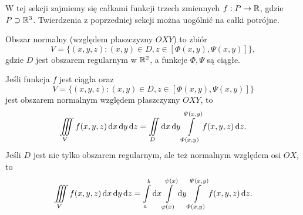 W tej sekcji zajmiemy się całkami funkcji trzech zmiennych $f : P \to \mathbb R$, gdzie $P \supset \mathbb R^3$. Twierdzenia z poprzedniej sekcji można uogólnić na całki potrójne.

\begin{definition}
    Obszar normalny (względem płaszczyzny $OXY$) to zbiór
    \[ V = \{(x, y, z) : (x, y) \in D, z \in [\varPhi(x, y), \varPsi(x, y)]\}, \]
    gdzie $D$ jest obszarem regularnym w $\mathbb R^2$, a funkcje $\varPhi, \varPsi$ są ciągłe.
\end{definition}

\begin{theorem}
    Jeśli funkcja $f$ jest ciągła oraz
    \[ V = \{(x, y, z) : (x, y) \in D, z \in [\varPhi(x, y), \varPsi(x, y)]\} \]
    jest obszarem normalnym względem płaszczyzny $OXY$, to
    \[ \iiint\limits_V f(x, y, z) \operatorname{d}\!{x} \operatorname{d}\!{y} \operatorname{d}\!{z} = \iint\limits_D \operatorname{d}\!{x} \operatorname{d}\!{y} \int\limits_{\varPhi(x, y)}^{\varPsi(x, y)} f(x, y, z) \operatorname{d}\!{z}. \]
    Jeśli $D$ jest nie tylko obszarem regularnym, ale też normalnym względem osi $OX$, to
    \[ \iiint\limits_V f(x, y, z) \operatorname{d}\!{x} \operatorname{d}\!{y} \operatorname{d}\!{z} = \int\limits_a^b \operatorname{d}\!{x} \int\limits_{\varphi(x)}^{\psi(x)} \operatorname{d}\!{y} \int\limits_{\varPhi(x, y)}^{\varPsi(x, y)} f(x, y, z) \operatorname{d}\!{z}. \]
\end{theorem}

